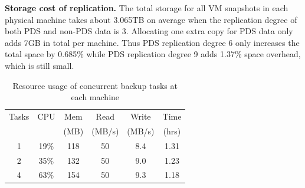 {\bf Storage cost of replication.} 
The total storage  for all VM snapshots in each physical machine takes about 3.065TB on average when
the replication degree of both PDS and non-PDS data is 3. 
Allocating  one extra  copy for PDS data only adds  7GB in total per machine.
Thus PDS replication degree 6 only increases the total space by 0.685\% while PDS replication degree 9 adds 1.37\% 
space overhead, which is still small.

\begin{table}
    \begin{tabular}{|c|c|c|c|c|c|}
    \hline
    Tasks & CPU & Mem &Read &  Write  & Time  \\ 
    & & (MB)          &(MB/s) &  (MB/s) & (hrs) \\ \hline
    1     & 19\% & 118 & 50 & 8.4 & 1.31\\ \hline
    2     & 35\% & 132 &50  & 9.0 & 1.23\\ \hline
    4     & 63\% & 154&50   & 9.3 & 1.18\\ \hline
    \end{tabular}
\caption{Resource usage of concurrent backup tasks at each machine}
\label{tab:resource_usage}
\end{table}

